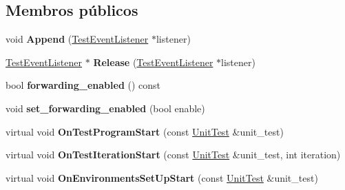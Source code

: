 \subsection*{Membros públicos}
\begin{DoxyCompactItemize}
\item 
\hypertarget{classtesting_1_1internal_1_1TestEventRepeater_ad154ce021881721a5c46994316b14cb1}{void {\bfseries Append} (\hyperlink{classtesting_1_1TestEventListener}{Test\-Event\-Listener} $\ast$listener)}\label{classtesting_1_1internal_1_1TestEventRepeater_ad154ce021881721a5c46994316b14cb1}

\item 
\hypertarget{classtesting_1_1internal_1_1TestEventRepeater_ac77a3d127e4726e11694e4ee9cf3b793}{\hyperlink{classtesting_1_1TestEventListener}{Test\-Event\-Listener} $\ast$ {\bfseries Release} (\hyperlink{classtesting_1_1TestEventListener}{Test\-Event\-Listener} $\ast$listener)}\label{classtesting_1_1internal_1_1TestEventRepeater_ac77a3d127e4726e11694e4ee9cf3b793}

\item 
\hypertarget{classtesting_1_1internal_1_1TestEventRepeater_a65c4a855a505ff74c843cf50ad56b4c1}{bool {\bfseries forwarding\-\_\-enabled} () const }\label{classtesting_1_1internal_1_1TestEventRepeater_a65c4a855a505ff74c843cf50ad56b4c1}

\item 
\hypertarget{classtesting_1_1internal_1_1TestEventRepeater_a86c52e311b70598a385a0589277e92e0}{void {\bfseries set\-\_\-forwarding\-\_\-enabled} (bool enable)}\label{classtesting_1_1internal_1_1TestEventRepeater_a86c52e311b70598a385a0589277e92e0}

\item 
\hypertarget{classtesting_1_1internal_1_1TestEventRepeater_a15ee2ff051063088d3a89a266d5ffcc4}{virtual void {\bfseries On\-Test\-Program\-Start} (const \hyperlink{classtesting_1_1UnitTest}{Unit\-Test} \&unit\-\_\-test)}\label{classtesting_1_1internal_1_1TestEventRepeater_a15ee2ff051063088d3a89a266d5ffcc4}

\item 
\hypertarget{classtesting_1_1internal_1_1TestEventRepeater_a4062b3f070bb6531ab8494c13d3635d3}{virtual void {\bfseries On\-Test\-Iteration\-Start} (const \hyperlink{classtesting_1_1UnitTest}{Unit\-Test} \&unit\-\_\-test, int iteration)}\label{classtesting_1_1internal_1_1TestEventRepeater_a4062b3f070bb6531ab8494c13d3635d3}

\item 
\hypertarget{classtesting_1_1internal_1_1TestEventRepeater_ae71819925adec0471fa7abc5072b8244}{virtual void {\bfseries On\-Environments\-Set\-Up\-Start} (const \hyperlink{classtesting_1_1UnitTest}{Unit\-Test} \&unit\-\_\-test)}\label{classtesting_1_1internal_1_1TestEventRepeater_ae71819925adec0471fa7abc5072b8244}


\end{DoxyCompactItemize}
